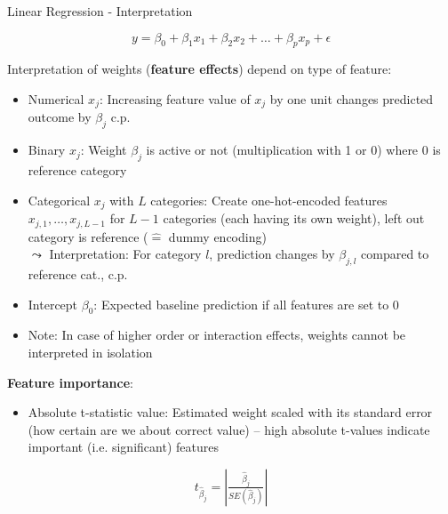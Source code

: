 \documentclass[11pt,compress,t,notes=noshow, aspectratio=169, xcolor=table]{beamer}
\begin{document}
\begin{frame}[c]{Linear Regression - Interpretation}

$$y = \beta_0 + \beta_1 x_1 + \beta_2 x_2 + \dots + \beta_p x_p + \epsilon$$

    Interpretation of weights (\textbf{feature effects}) depend on type of feature:
    \begin{itemize}
        \item Numerical $x_j$: Increasing feature value of $x_j$ by one unit changes predicted outcome by $\beta_j$ c.p.
        \pause
        \item Binary $x_j$: Weight $\beta_j$ is active or not (multiplication with 1 or 0) where 0 is reference category
        \item %
        Categorical $x_j$ with $L$ categories: Create one-hot-encoded features $x_{j,1}, \hdots, x_{j,L-1}$ for $L-1$ categories (each having its own weight), left out category is reference ($\hat =$ dummy encoding)\\
        $\leadsto$ Interpretation:
        For category $l$, prediction changes by $\beta_{j,l}$ compared to reference cat.,  c.p.\pause
        \item Intercept $\beta_0$: Expected baseline prediction if all features are set to 0 %
        \item Note: In case of higher order or interaction effects, weights cannot be interpreted in isolation
    \end{itemize}	
    \pause
    \textbf{Feature importance}:
    \begin{itemize}
        \item Absolute t-statistic value: Estimated weight scaled with its standard error (how certain are we about correct value) -- high absolute t-values indicate important (i.e. significant) features
    \end{itemize}
    $$t_{\hat\beta_j} = \left| \tfrac{\hat\beta_j}{SE(\hat\beta_j)} \right|$$
\end{frame}
\end{document}

